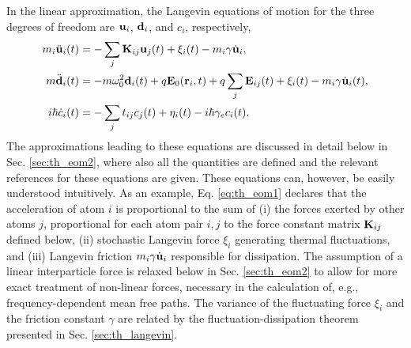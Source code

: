 In the linear approximation, the Langevin equations of motion for the three degrees of freedom are $\mathbf{u}_i$, $\mathbf{d}_i$, and $c_i$, respectively, \cite{bolsterli70,rosa10,rosa11,dhar03}
\begin{subequations}
\begin{align}
 m_i \ddot{\mathbf{u}}_i(t) &=  - \sum_j \mathbf{K}_{ij}\mathbf{u}_j(t) + \xi_i(t) - m_i \gamma \dot{\mathbf{u}}_i, \label{eq:th_eom1} \\
 m \ddot{\mathbf{d}}_i(t) &= - m\omega_0^2 \mathbf{d}_i(t) + q\mathbf{E}_0(\mathbf{r}_i,t)+q\sum_{j} \mathbf{E}_{ij}(t)+\xi_i(t) - m_i \gamma \dot{\mathbf{u}}_i(t), \label{eq:th_eom2}\\
 i\hbar \dot{c}_i(t) &= -\sum_j t_{ij} c_j(t) +\eta_i(t) - i\hbar \gamma_e c_i(t) \label{eq:th_eom3}.
\end{align}
\end{subequations}
The approximations leading to these equations are discussed in detail below in Sec. \ref{sec:th_eom2}, where also all the quantities are defined and the relevant references for these equations are given. These equations can, however, be easily understood intuitively. As an example, Eq. \eqref{eq:th_eom1} declares that the acceleration of atom $i$ is proportional to the sum of (i) the forces exerted by other atoms $j$, proportional for each atom pair $i,j$ to the force constant matrix $\mathbf{K}_{ij}$ defined below, (ii) stochastic Langevin force $\xi_i$ generating thermal fluctuations, and (iii) Langevin friction $m_i \gamma \dot{\mathbf{u}}_i$ responsible for dissipation. The assumption of a linear interparticle force is relaxed below in Sec. \ref{sec:th_eom2} to allow for more exact treatment of non-linear forces, necessary in the calculation of, e.g., frequency-dependent mean free paths. The variance of the fluctuating force $\xi_i$ and the friction constant $\gamma$ are related by the fluctuation-dissipation theorem presented in Sec. \ref{sec:th_langevin}. 

